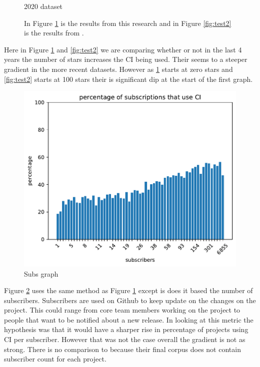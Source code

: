 \documentclass[twoside,12pt,titlepage,a4paper]{article}
\begin{document}
\begin{figure}[!htbp]
\begin{minipage}{.48\textwidth}
    \caption{2020 dataset}
    \label{fig:test1}
  \end{minipage}%
  \hfill
  \caption{In Figure \ref{fig:test1} is the results from this research and in Figure \ref{fig:test2} is the results from \cite{Hilton2016}.}
\end{figure}

Here in Figure \ref{fig:test1} and \ref{fig:test2} we are comparing whether or not in the last 4 years the number of stars increases the CI being used. Their seems to a steeper gradient in the more recent datasets. However as \ref{fig:test1} starts at zero stars and \ref{fig:test2} starts at 100 stars their is significant dip at the start of the first graph.
\begin{figure}[!h]
  \centering
  \includegraphics[width=.8\textwidth]{../src/results/percentage sub with CI.pdf}
  \caption{Subs graph}
  \label{graph_percentage_subs}
\end{figure}
Figure \ref{graph_percentage_subs} uses the same method as Figure \ref{fig:test1} except is does it based the number of subscribers. Subscribers are used on Github to keep update on the changes on the project. This could range from core team members working on the project to people that want to be notified about a new release. 
In looking at this metric the hypothesis was that it would have a sharper rise in percentage of projects using CI per subscriber. However that was not the case overall the gradient is not as strong. There is no comparison to \cite{Hilton2016} because their final corpus does not contain subscriber count for each project.
\end{document}
